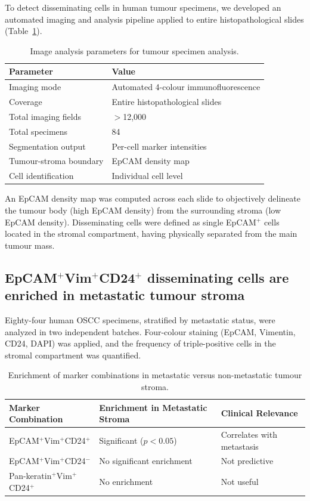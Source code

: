 \documentclass[11pt]{article}
\begin{document}
To detect disseminating cells in human tumour specimens, we developed an automated imaging and analysis pipeline applied to entire histopathological slides (Table~\ref{tab:imaging}).

\begin{table}[ht]
\centering
\caption{Image analysis parameters for tumour specimen analysis.}
\label{tab:imaging}
\begin{tabular}{ll}
\toprule
Parameter & Value \\
\midrule
Imaging mode & Automated 4-colour immunofluorescence \\
Coverage & Entire histopathological slides \\
Total imaging fields & $>$12,000 \\
Total specimens & 84 \\
Segmentation output & Per-cell marker intensities \\
Tumour-stroma boundary & EpCAM density map \\
Cell identification & Individual cell level \\
\bottomrule
\end{tabular}
\end{table}

An EpCAM density map was computed across each slide to objectively delineate the tumour body (high EpCAM density) from the surrounding stroma (low EpCAM density). Disseminating cells were defined as single EpCAM$^{+}$ cells located in the stromal compartment, having physically separated from the main tumour mass.

\subsection{EpCAM$^{+}$Vim$^{+}$CD24$^{+}$ disseminating cells are enriched in metastatic tumour stroma}

Eighty-four human OSCC specimens, stratified by metastatic status, were analyzed in two independent batches. Four-colour staining (EpCAM, Vimentin, CD24, DAPI) was applied, and the frequency of triple-positive cells in the stromal compartment was quantified.

\begin{table}[ht]
\centering
\caption{Enrichment of marker combinations in metastatic versus non-metastatic tumour stroma.}
\label{tab:enrichment}
\begin{tabular}{lll}
\toprule
Marker Combination & Enrichment in Metastatic Stroma & Clinical Relevance \\
\midrule
EpCAM$^{+}$Vim$^{+}$CD24$^{+}$ & Significant ($p < 0.05$) & Correlates with metastasis \\
EpCAM$^{+}$Vim$^{+}$CD24$^{-}$ & No significant enrichment & Not predictive \\
Pan-keratin$^{+}$Vim$^{+}$CD24$^{+}$ & No enrichment & Not useful \\
\bottomrule
\end{tabular}
\end{table}
\end{document}
